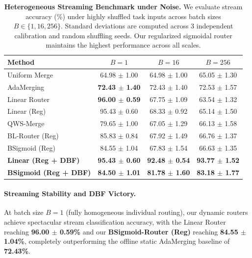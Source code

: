\begin{table}[t]
\caption{\textbf{Heterogeneous Streaming Benchmark under Noise.} We evaluate stream accuracy (\%) under highly shuffled task inputs across batch sizes $B \in \{1, 16, 256\}$. Standard deviations are computed across 3 independent calibration and random shuffling seeds. Our regularized sigmoidal router maintains the highest performance across all scales.}
\label{tab:streaming}
\vskip 0.15in
\begin{center}
\begin{scriptsize}
\setlength{\tabcolsep}{0.6pt}
\begin{tabular}{lccc}
\toprule
Method & $B = 1$ & $B = 16$ & $B = 256$ \\
\midrule
Uniform Merge & 64.98 $\pm$ 1.00 & 64.98 $\pm$ 1.00 & 65.05 $\pm$ 1.30 \\
AdaMerging & \textbf{72.43 $\pm$ 1.40} & 72.43 $\pm$ 1.40 & 72.53 $\pm$ 1.57 \\
\midrule
Linear Router & \textbf{96.00 $\pm$ 0.59} & 67.75 $\pm$ 1.09 & 63.54 $\pm$ 1.32 \\
Linear (Reg) & 95.43 $\pm$ 0.60 & 68.33 $\pm$ 0.92 & 65.14 $\pm$ 1.50 \\
\midrule
QWS-Merge & 79.65 $\pm$ 1.00 & 67.05 $\pm$ 1.29 & 66.13 $\pm$ 1.58 \\
\midrule
BL-Router (Reg) & 85.83 $\pm$ 0.84 & 67.92 $\pm$ 1.49 & 66.76 $\pm$ 1.37 \\
BSigmoid (Reg) & 84.55 $\pm$ 1.04 & 67.83 $\pm$ 1.54 & 66.63 $\pm$ 1.35 \\
\midrule
\textbf{Linear (Reg + DBF)} & \textbf{95.43 $\pm$ 0.60} & \textbf{92.48 $\pm$ 0.54} & \textbf{93.77 $\pm$ 1.52} \\
\textbf{BSigmoid (Reg + DBF)} & \textbf{84.50 $\pm$ 1.01} & \textbf{81.78 $\pm$ 1.60} & \textbf{83.18 $\pm$ 1.77} \\
\bottomrule
\end{tabular}
\end{scriptsize}
\end{center}
\vskip -0.1in
\end{table}

\paragraph{Streaming Stability and DBF Victory.}
At batch size $B=1$ (fully homogeneous individual routing), our dynamic routers achieve spectacular stream classification accuracy, with the Linear Router reaching \textbf{96.00 $\pm$ 0.59\%} and our \textbf{BSigmoid-Router (Reg)} reaching \textbf{84.55 $\pm$ 1.04\%}, completely outperforming the offline static AdaMerging baseline of \textbf{72.43\%}. 

